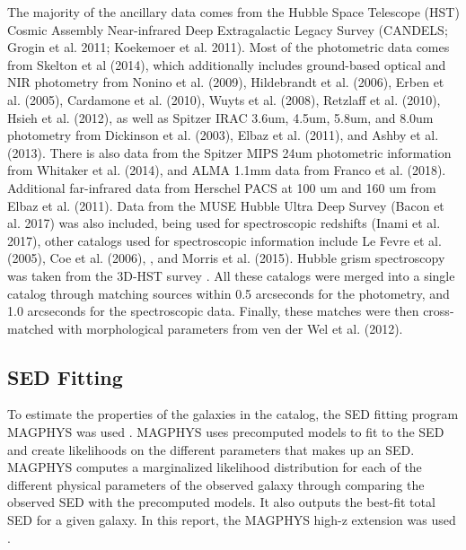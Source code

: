 The majority of the ancillary data comes from the Hubble Space Telescope (HST) Cosmic Assembly Near-infrared Deep Extragalactic Legacy Survey (CANDELS; Grogin et al. 2011; Koekemoer et al. 2011). Most of the photometric data comes from Skelton et al (2014), which additionally includes ground-based optical and NIR photometry from Nonino et al. (2009), Hildebrandt et al. (2006), Erben et al. (2005), Cardamone et al. (2010), Wuyts et al. (2008), Retzlaff et al. (2010), Hsieh et al. (2012), as well as Spitzer IRAC 3.6um, 4.5um, 5.8um, and 8.0um photometry from Dickinson et al. (2003), Elbaz et al. (2011), and Ashby et al. (2013). There is also data from the Spitzer MIPS 24um photometric information from Whitaker et al. (2014), and ALMA 1.1mm data from Franco et al. (2018). Additional far-infrared data from Herschel PACS at 100 um and 160 um from Elbaz et al. (2011). Data from the MUSE Hubble Ultra Deep Survey (Bacon et al. 2017) was also included, being used for spectroscopic redshifts (Inami et al. 2017), other catalogs used for spectroscopic information include Le Fevre et al. (2005), Coe et al. (2006), \cite{skelton20143d}, and Morris et al. (2015). Hubble grism spectroscopy was taken from the 3D-HST survey \cite{momcheva20163d}.  All these catalogs were merged into a single catalog through matching sources within 0.5 arcseconds for the photometry, and 1.0 arcseconds for the spectroscopic data. Finally, these matches were then cross-matched with morphological parameters from ven der Wel et al. (2012).




\subsection{SED Fitting}

To estimate the properties of the galaxies in the catalog, the SED fitting program MAGPHYS was used \cite{da2008simple, da2015alma}. MAGPHYS uses precomputed models to fit to the SED and create likelihoods on the different parameters that makes up an SED. MAGPHYS computes a marginalized likelihood distribution for each of the different physical parameters of the observed galaxy through comparing the observed SED with the precomputed models. It also outputs the best-fit total SED for a given galaxy. In this report, the MAGPHYS high-z extension was used \cite{da2015alma}.

